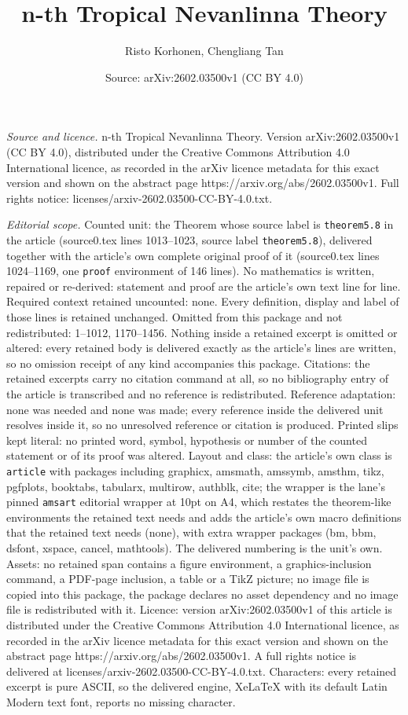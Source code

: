 \documentclass[10pt,a4paper]{amsart}
\title[n-th Tropical Nevanlinna Theory]{n-th Tropical Nevanlinna Theory}
\author{Risto Korhonen, Chengliang Tan}
\date{Source: arXiv:2602.03500v1 (CC BY 4.0)}
\begin{document}
\maketitle

\noindent\emph{Source and licence.} n-th Tropical Nevanlinna Theory. Version arXiv:2602.03500v1 (CC BY 4.0), distributed under the Creative Commons Attribution 4.0 International licence, as recorded in the arXiv licence metadata for this exact version and shown on the abstract page https://arxiv.org/abs/2602.03500v1. Full rights notice: licenses/arxiv-2602.03500-CC-BY-4.0.txt.\par\smallskip

\noindent\textit{Editorial scope.} Counted unit: the Theorem whose source label is \texttt{theorem5.8} in the article (source0.tex lines 1013--1023, source label \texttt{theorem5.8}), delivered together with the article's own complete original proof of it (source0.tex lines 1024--1169, one \texttt{proof} environment of 146 lines). No mathematics is written, repaired or re-derived: statement and proof are the article's own text line for line. Required context retained uncounted: none. Every definition, display and label of those lines is retained unchanged. Omitted from this package and not redistributed: 1--1012, 1170--1456. Nothing inside a retained excerpt is omitted or altered: every retained body is delivered exactly as the article's lines are written, so no omission receipt of any kind accompanies this package. Citations: the retained excerpts carry no citation command at all, so no bibliography entry of the article is transcribed and no reference is redistributed. Reference adaptation: none was needed and none was made; every reference inside the delivered unit resolves inside it, so no unresolved reference or citation is produced. Printed slips kept literal: no printed word, symbol, hypothesis or number of the counted statement or of its proof was altered. Layout and class: the article's own class is \texttt{article} with packages including graphicx, amsmath, amssymb, amsthm, tikz, pgfplots, booktabs, tabularx, multirow, authblk, cite; the wrapper is the lane's pinned \texttt{amsart} editorial wrapper at 10pt on A4, which restates the theorem-like environments the retained text needs and adds the article's own macro definitions that the retained text needs (none), with extra wrapper packages (bm, bbm, dsfont, xspace, cancel, mathtools). The delivered numbering is the unit's own. Assets: no retained span contains a figure environment, a graphics-inclusion command, a PDF-page inclusion, a table or a TikZ picture; no image file is copied into this package, the package declares no asset dependency and no image file is redistributed with it. Licence: version arXiv:2602.03500v1 of this article is distributed under the Creative Commons Attribution 4.0 International licence, as recorded in the arXiv licence metadata for this exact version and shown on the abstract page https://arxiv.org/abs/2602.03500v1. A full rights notice is delivered at licenses/arxiv-2602.03500-CC-BY-4.0.txt. Characters: every retained excerpt is pure ASCII, so the delivered engine, XeLaTeX with its default Latin Modern text font, reports no missing character.
\end{document}
